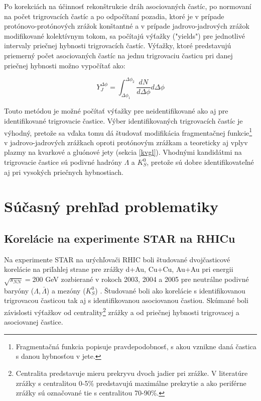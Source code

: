 \documentclass[thesismargins, thesislinespacing]{rnthesis}
\begin{document}
Po korekciách na účinnosť rekonštrukcie dráh asociovaných častíc, po normovaní na počet trigrovacích častíc a po odpočítaní pozadia, ktoré je v prípade protónovo-protónových zrážok konštantné a v prípade jadrovo-jadrových zrážok modifikované kolektívnym tokom, sa počítajú výťažky ("yields") pre jednotlivé intervaly priečnej hybnosti trigrovacích častíc. Výťažky, ktoré predstavujú priemerný počet asociovaných častíc na jednu trigrovaciu časticu pri danej priečnej hybnosti možno vypočítať ako:

\begin{equation}
Y_J^{\Delta\phi}=\int_{\Delta \phi_1}^{\Delta \phi_2} \frac{dN}{d\Delta \phi } d\Delta\phi 
\label{yield}
\end{equation} 

Touto metódou je možné počítať výťažky pre neidentifikované ako aj pre identifikované trigrovacie častice. Výber identifikovaných trigrovacích častíc je výhodný, pretože sa vďaka tomu dá študovať modifikácia fragmentačnej funkcie\footnote{Fragmentačná funkcia popisuje pravdepodobnosť, s akou vznikne daná častica s danou hybnosťou v jete.} v jadrovo-jadrových zrážkach oproti protónovým zrážkam a teoreticky aj vplyv plazmy na kvarkové a gluónové jety (sekcia \ref{kvgl}). Vhodnými kandidátmi na trigrovacie častice sú podivné hadróny $\Lambda$ a $K^0_S$, pretože sú dobre identifikovateľné aj pri vysokých priečnych hybnostiach. 

\section{Súčasný prehľad problematiky}
\subsection{Korelácie na experimente STAR na RHICu}
Na experimente STAR na urýchľovači RHIC boli študované dvojčasticové korelácie na priľahlej strane pre zrážky d+Au, Cu+Cu, Au+Au pri energii $\sqrt{s_{NN}}=$200 GeV zozbierané v rokoch 2003, 2004 a 2005 pre neutrálne podivné baryóny ($\Lambda , \bar{\Lambda}$) a mezóny ($K^0_S$) \cite{clanokstar}. Študované boli ako korelácie s identifikovanou trigrovacou časticou tak aj s identifikovanou asociovanou častiou. Skúmané boli závislosti výťažkov od centrality\footnote{Centralita predstavuje mieru prekryvu dvoch jadier pri zrážke. V literatúre zrážky s centralitou 0-5\% predstavujú maximálne prekrytie a ako periférne zrážky sú označované tie s centralitou 70-90\%.} zrážky a od priečnej hybnosti trigrovacej a asociovanej častice.
\end{document}
